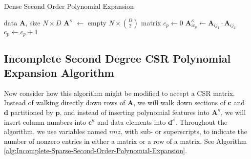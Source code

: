 \documentclass[journal]{journal}
\begin{document}

\begin{algorithm}%
   \caption{Dense Second Order Polynomial Expansion}
   \label{alg:Dense-Second-Order-Polynomial-Expansion}
\begin{algorithmic}[1]
    data $\bm{A}$, size $N \times D$
   \STATE $\bm{A}^\kappa$ $\gets$ empty $N \times \binom{D}{2}$ matrix
      \STATE $c_p \gets 0$
              \STATE $\bm{A}^\kappa_{i{c_p}} \gets \bm{A}_{ij_1} \cdot \bm{A}_{ij_2}$
              \STATE $c_p \gets c_p + 1$
          \ENDFOR
      \ENDFOR
   \ENDFOR
\end{algorithmic}
\end{algorithm}


\subsection{Incomplete Second Degree CSR Polynomial Expansion Algorithm}
\label{sec:final-algo}
Now consider how this algorithm might be modified to accept a CSR matrix.
Instead of walking directly down rows of $\bm{A}$, we will walk down sections of $\bm{c}$ and $\bm{d}$ partitioned by $\bm{p}$, and instead of inserting polynomial features into $\bm{A}^\kappa$, we will insert column numbers into $\bm{c}^\kappa$ and data elements into $\bm{d}^\kappa$.
Throughout the algorithm, we use variables named $nnz$, with sub- or superscripts, to indicate the number of nonzero entries in either a matrix or a row of a matrix. 
See Algorithm \ref{alg:Incomplete-Sparse-Second-Order-Polynomial-Expansion}.

\end{document}
